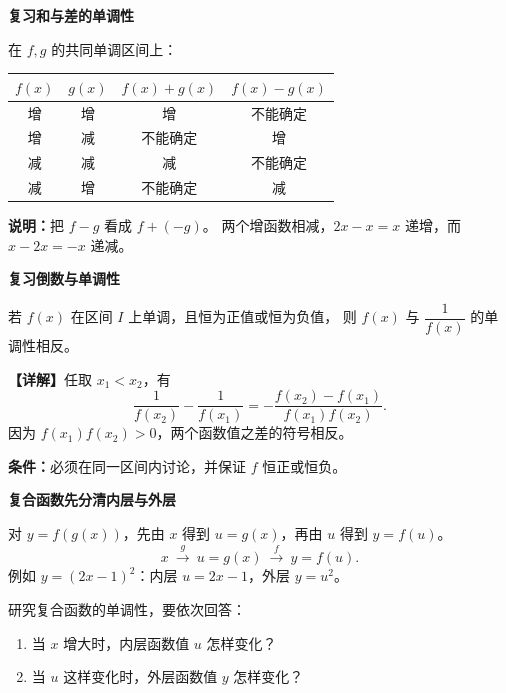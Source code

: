 \documentclass[UTF8,10pt,aspectratio=169]{ctexbeamer}
\newcommand{\PageHeading}[1]{\begin{center}{\Large\bfseries #1}\end{center}\vspace{0.2cm}}
\newcommand{\Analysis}[1]{\par\vspace{0.2cm}\textbf{【详解】}#1}
\begin{document}
\begin{frame}[t,label=F03]
  \PageHeading{复习\quad 和与差的单调性}
  在 $f,g$ 的共同单调区间上：
  \begin{center}
  \renewcommand{\arraystretch}{1.55}
  \begin{tabular}{c|c|c|c}
    $f(x)$ & $g(x)$ & $f(x)+g(x)$ & $f(x)-g(x)$\\\hline
    增 & 增 & 增 & 不能确定\\
    增 & 减 & 不能确定 & 增\\
    减 & 减 & 减 & 不能确定\\
    减 & 增 & 不能确定 & 减
  \end{tabular}
  \end{center}
  \pause
  \textbf{说明：}把 $f-g$ 看成 $f+(-g)$。
  两个增函数相减，$2x-x=x$ 递增，而 $x-2x=-x$ 递减。
\end{frame}

\begin{frame}[t,label=F04]
  \PageHeading{复习\quad 倒数与单调性}
  若 $f(x)$ 在区间 $I$ 上单调，且恒为正值或恒为负值，
  则 $f(x)$ 与 $\dfrac1{f(x)}$ 的单调性相反。
  \pause
  \Analysis{任取 $x_1<x_2$，有
  \[
    \frac1{f(x_2)}-\frac1{f(x_1)}
      =-\frac{f(x_2)-f(x_1)}{f(x_1)f(x_2)}.
  \]
  因为 $f(x_1)f(x_2)>0$，两个函数值之差的符号相反。}
  \par\vspace{0.3cm}
  \textbf{条件：}必须在同一区间内讨论，并保证 $f$ 恒正或恒负。
\end{frame}

\begin{frame}[t,label=F05]
  \PageHeading{复合函数\quad 先分清内层与外层}
  对 $y=f(g(x))$，先由 $x$ 得到 $u=g(x)$，再由 $u$ 得到 $y=f(u)$。
  \[
    x\ \xrightarrow{\ g\ }\ u=g(x)\ \xrightarrow{\ f\ }\ y=f(u).
  \]
  例如 $y=(2x-1)^2$：内层 $u=2x-1$，外层 $y=u^2$。
  \pause
  \par\vspace{0.3cm}
  研究复合函数的单调性，要依次回答：
  \begin{enumerate}
    \item 当 $x$ 增大时，内层函数值 $u$ 怎样变化？
    \item 当 $u$ 这样变化时，外层函数值 $y$ 怎样变化？
  \end{enumerate}
\end{frame}
\end{document}
